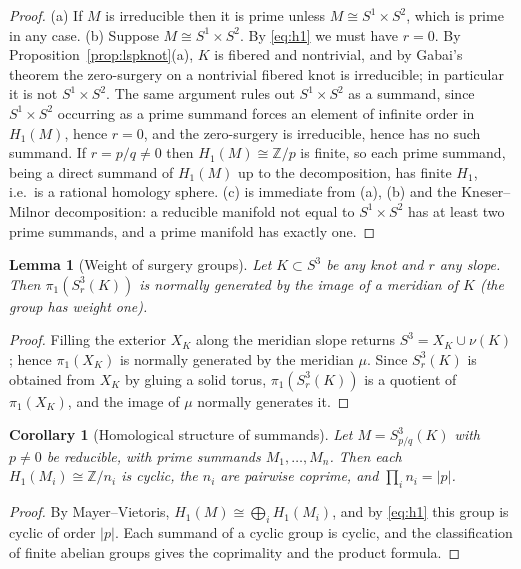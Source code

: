 \documentclass[11pt]{amsart}
\newtheorem{lemma}[theorem]{Lemma}
\newtheorem{corollary}[theorem]{Corollary}
\theoremstyle{definition}
\theoremstyle{remark}
\numberwithin{equation}{section}
\begin{document}
\begin{proof}
(a) If $M$ is irreducible then it is prime unless $M\cong S^{1}\times
S^{2}$, which is prime in any case. (b) Suppose $M\cong S^{1}\times S^{2}$.
By \eqref{eq:h1} we must have $r=0$. By
Proposition~\ref{prop:lspknot}(a), $K$ is fibered and nontrivial, and by
Gabai's theorem \cite{Gabai} the zero-surgery on a nontrivial fibered knot
is irreducible; in particular it is not $S^{1}\times S^{2}$. The same
argument rules out $S^{1}\times S^{2}$ as a summand, since
$S^{1}\times S^{2}$ occurring as a prime summand forces an element of
infinite order in $H_{1}(M)$, hence $r=0$, and the zero-surgery is
irreducible, hence has no such summand. If $r=p/q\neq0$ then
$H_{1}(M)\cong\mathbb{Z}/p$ is finite, so each prime summand, being a
direct summand of $H_{1}(M)$ up to the decomposition, has finite $H_{1}$,
i.e.\ is a rational homology sphere. (c) is immediate from (a), (b) and
the Kneser--Milnor decomposition: a reducible manifold not equal to
$S^{1}\times S^{2}$ has at least two prime summands, and a prime manifold
has exactly one.
\end{proof}

\begin{lemma}[Weight of surgery groups]\label{lem:weight}
Let $K\subset S^{3}$ be any knot and $r$ any slope. Then $\pi_{1}
(S^{3}_{r}(K))$ is normally generated by the image of a meridian of $K$
(the group has \emph{weight one}).
\end{lemma}

\begin{proof}
Filling the exterior $X_{K}$ along the meridian slope returns
$S^{3}=X_{K}\cup\nu(K)$; hence $\pi_{1}(X_{K})$ is normally generated by
the meridian $\mu$. Since $S^{3}_{r}(K)$ is obtained from $X_{K}$ by
gluing a solid torus, $\pi_{1}(S^{3}_{r}(K))$ is a quotient of
$\pi_{1}(X_{K})$, and the image of $\mu$ normally generates it.
\end{proof}

\begin{corollary}[Homological structure of summands]\label{cor:hom}
Let $M=S^{3}_{p/q}(K)$ with $p\neq0$ be reducible, with prime summands
$M_{1},\dots,M_{n}$. Then each $H_{1}(M_{i})\cong\mathbb{Z}/n_{i}$ is
cyclic, the $n_{i}$ are pairwise coprime, and $\prod_{i}n_{i}=|p|$.
\end{corollary}

\begin{proof}
By Mayer--Vietoris, $H_{1}(M)\cong\bigoplus_i H_{1}(M_{i})$, and by
\eqref{eq:h1} this group is cyclic of order $|p|$. Each summand of a
cyclic group is cyclic, and the classification of finite abelian groups
gives the coprimality and the product formula.
\end{proof}
\end{document}
